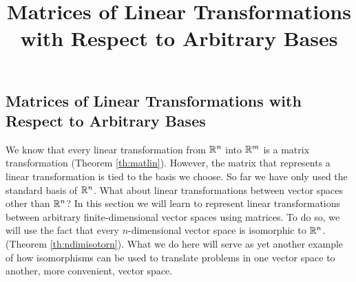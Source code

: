 \documentclass{ximera}
\title{Matrices of Linear Transformations with Respect to Arbitrary Bases} \license{CC BY-NC-SA 4.0}
\begin{document}
\begin{abstract}
 \end{abstract}
\maketitle

\begin{onlineOnly}
\section*{Matrices of Linear Transformations with Respect to Arbitrary Bases}
\end{onlineOnly}

We know that every linear transformation from $\mathbb{R}^n$ into $\mathbb{R}^m$ is a matrix transformation  (Theorem \ref{th:matlin}).  However, the matrix that represents a linear transformation is tied to the basis we choose.  So far we have only used the standard basis of $\mathbb{R}^n$.  What about linear transformations between vector spaces other than $\mathbb{R}^n$?  In this section we will learn to represent linear transformations between arbitrary finite-dimensional vector spaces using matrices.  To do so, we will use the fact that every $n$-dimensional vector space is isomorphic to $\mathbb{R}^n$.  (Theorem \ref{th:ndimisotorn}). What we do here will serve as yet another example of how isomorphisms can be used to translate problems in one vector space to another, more convenient, vector space.
\end{document}
